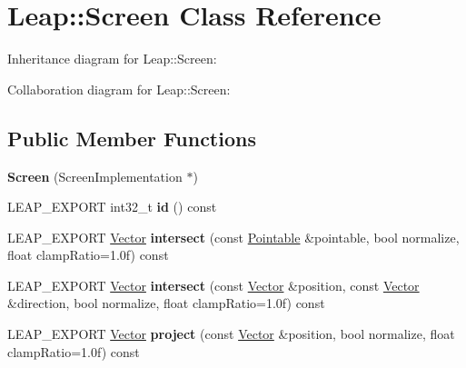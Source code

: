 \hypertarget{class_leap_1_1_screen}{}\section{Leap\+:\+:Screen Class Reference}
\label{class_leap_1_1_screen}


Inheritance diagram for Leap\+:\+:Screen\+:


Collaboration diagram for Leap\+:\+:Screen\+:
\subsection*{Public Member Functions}
\begin{DoxyCompactItemize}
\item 
\mbox{\label{class_leap_1_1_screen_ae4bacceec22fd48fa983f863854a1442}} 
{\bfseries Screen} (Screen\+Implementation $\ast$)
\item 
\mbox{\label{class_leap_1_1_screen_ac2b2e92ac8d200c557441c0410f7b247}} 
L\+E\+A\+P\+\_\+\+E\+X\+P\+O\+RT int32\+\_\+t {\bfseries id} () const
\item 
\mbox{\label{class_leap_1_1_screen_abc29794cec5d108c7e7dde0d6e5da52b}} 
L\+E\+A\+P\+\_\+\+E\+X\+P\+O\+RT \hyperlink{struct_leap_1_1_vector}{Vector} {\bfseries intersect} (const \hyperlink{class_leap_1_1_pointable}{Pointable} \&pointable, bool normalize, float clamp\+Ratio=1.\+0f) const
\item 
\mbox{\label{class_leap_1_1_screen_a0f80cb7d427470464d4a67689af8ed63}} 
L\+E\+A\+P\+\_\+\+E\+X\+P\+O\+RT \hyperlink{struct_leap_1_1_vector}{Vector} {\bfseries intersect} (const \hyperlink{struct_leap_1_1_vector}{Vector} \&position, const \hyperlink{struct_leap_1_1_vector}{Vector} \&direction, bool normalize, float clamp\+Ratio=1.\+0f) const
\item 
\mbox{\label{class_leap_1_1_screen_a0464f2601b1e265cc2af22880c7e53f8}} 
L\+E\+A\+P\+\_\+\+E\+X\+P\+O\+RT \hyperlink{struct_leap_1_1_vector}{Vector} {\bfseries project} (const \hyperlink{struct_leap_1_1_vector}{Vector} \&position, bool normalize, float clamp\+Ratio=1.\+0f) const
\item 
\mbox{\label{class_leap_1_1_screen_ae5fc05986f7126c2b7f7bbb86b6079f5}} 

\end{DoxyCompactItemize}
